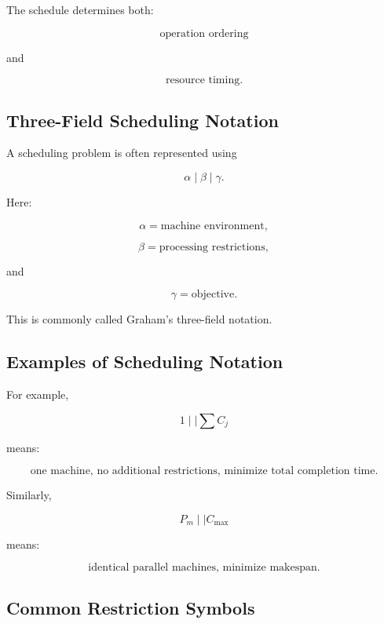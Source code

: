 The schedule determines both:

\[
\boxed{
\text{operation ordering}
}
\]

and

\[
\boxed{
\text{resource timing}.
}
\]

\subsection{Three-Field Scheduling Notation}
\label{subsec:three-field-scheduling-notation}

A scheduling problem is often represented using

\[
\boxed{
\alpha
\mid
\beta
\mid
\gamma.
}
\]

Here:

\[
\alpha
=
\text{machine environment},
\]

\[
\beta
=
\text{processing restrictions},
\]

and

\[
\gamma
=
\text{objective}.
\]

This is commonly called Graham's three-field notation.

\subsection{Examples of Scheduling Notation}
\label{subsec:scheduling-notation-examples}

For example,

\[
\boxed{
1
\mid
\mid
\sum C_j
}
\]

means:

\[
\boxed{
\text{one machine, no additional restrictions, minimize total completion
time}.
}
\]

Similarly,

\[
\boxed{
P_m
\mid
\mid
C_{\max}
}
\]

means:

\[
\boxed{
\text{identical parallel machines, minimize makespan}.
}
\]

\subsection{Common Restriction Symbols}
\label{subsec:scheduling-restriction-symbols}

